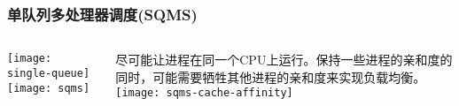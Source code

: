 \begin{frame}
    \frametitle{单队列多处理器调度(SQMS)}	
	\begin{columns}
		\begin{column}{.5\textwidth}
			\Large \centering
			\texttt{[image: single-queue]}
			\texttt{[image: sqms]}	
		\end{column}
		
		\begin{column}{.5\textwidth}
			\large
			\normalsize
			尽可能让进程在同一个CPU上运行。保持一些进程的亲和度的同时，可能需要牺牲其他进程的亲和度来实现负载均衡。
			\texttt{[image: sqms-cache-affinity]}

			
		\end{column}
	\end{columns}
\end{frame}

